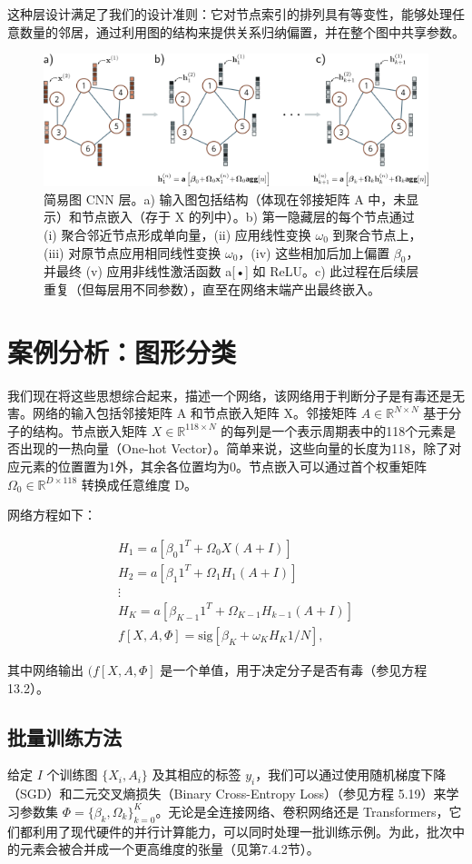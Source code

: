 这种层设计满足了我们的设计准则：它对节点索引的排列具有等变性，能够处理任意数量的邻居，通过利用图的结构来提供关系归纳偏置，并在整个图中共享参数。

\begin{figure}[ht!]
\centering
\includegraphics[width=0.7\linewidth]{png/chapter13/GraphGCN.png}
\caption{简易图 CNN 层。a) 输入图包括结构（体现在邻接矩阵 A 中，未显示）和节点嵌入（存于 X 的列中）。b) 第一隐藏层的每个节点通过 (i) 聚合邻近节点形成单向量，(ii) 应用线性变换 \(\omega_0\) 到聚合节点上，(iii) 对原节点应用相同线性变换 \(\omega_0\)，(iv) 这些相加后加上偏置 \(\beta_0\)，并最终 (v) 应用非线性激活函数 a[•] 如 ReLU。c) 此过程在后续层重复（但每层用不同参数），直至在网络末端产出最终嵌入。}
\end{figure}


\section{案例分析：图形分类}
我们现在将这些思想综合起来，描述一个网络，该网络用于判断分子是有毒还是无害。网络的输入包括邻接矩阵 A 和节点嵌入矩阵 X。邻接矩阵 \(A \in \mathbb{R}^{N \times N}\) 基于分子的结构。节点嵌入矩阵 \(X \in \mathbb{R}^{118 \times N}\) 的每列是一个表示周期表中的118个元素是否出现的一热向量（One-hot Vector）。简单来说，这些向量的长度为118，除了对应元素的位置置为1外，其余各位置均为0。节点嵌入可以通过首个权重矩阵  \(\Omega_0 \in \mathbb{R}^{D \times 118}\) 转换成任意维度 D。

网络方程如下：


\begin{align}
H_1 = a[\beta_0 1^T + \Omega_0 X(A + I)] \\
H_2 = a[\beta_1 1^T + \Omega_1 H_1(A + I)] \\
\vdots \\
H_K = a[\beta_{K-1} 1^T + \Omega_{K-1} H_{k-1}(A + I)] \\
f[X, A, \Phi] = \text{sig}[\beta_K + \omega_K H_K 1/N], 
\end{align} 


其中网络输出 \((f[X, A, \Phi]\) 是一个单值，用于决定分子是否有毒（参见方程 13.2）。
\subsection{批量训练方法}
给定 \(I\) 个训练图 \(\{X_i, A_i\}\) 及其相应的标签 \(y_i\)，我们可以通过使用随机梯度下降（SGD）和二元交叉熵损失（Binary Cross-Entropy Loss）（参见方程 5.19）来学习参数集 \(\Phi = \{\beta_k, \Omega_k\}^K_{k=0}\)。无论是全连接网络、卷积网络还是 Transformers，它们都利用了现代硬件的并行计算能力，可以同时处理一批训练示例。为此，批次中的元素会被合并成一个更高维度的张量（见第7.4.2节）。

